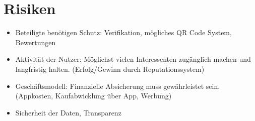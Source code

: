 
\section{Risiken}
\begin{itemize}
   \item Beteiligte benötigen Schutz: Verifikation, mögliches QR Code System, Bewertungen
   \item Aktivität der Nutzer: Möglichst vielen Interessenten zugänglich machen und langfristig halten. (Erfolg/Gewinn durch Reputationssystem)
   \item Geschäftsmodell: Finanzielle Absicherung muss gewährleistet sein. (Appkosten, Kaufabwicklung über App, Werbung)
   \item Sicherheit der Daten, Transparenz
      
\end{itemize}
 